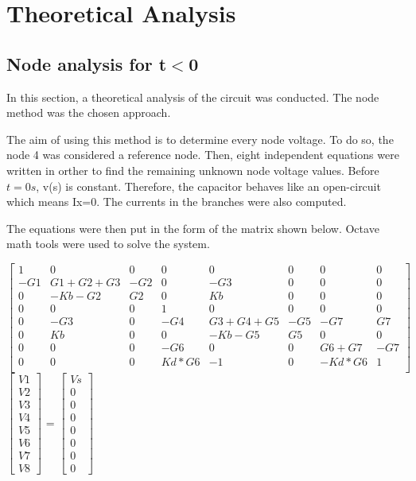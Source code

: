 \section{Theoretical Analysis} \label{section:theo}


\subsection{Node analysis for t$<$0}

\par In this section, a theoretical analysis of the circuit was conducted. The node method was the chosen approach.

The aim of using this method is to determine every node voltage. To do so, the node 4 was considered a reference node. Then, eight independent equations were written in orther to find the remaining unknown node voltage values. Before $t=0s$, v(s) is constant. Therefore, the capacitor behaves like an open-circuit which means Ix=0. The currents in the branches were also computed.


The equations were then put in the form of the matrix shown below. Octave math tools were used to solve the system.



$\begin{bmatrix}
1 & 0 & 0 & 0 & 0 & 0 & 0 & 0\\
-G1 & G1+G2+G3 & -G2 & 0 & -G3 & 0 & 0 & 0\\
0 &-Kb-G2 & G2 & 0 & Kb & 0 & 0 & 0\\
0 & 0 & 0 & 1 & 0 & 0 & 0 & 0\\
0 & -G3 & 0 & -G4 & G3+G4+G5 & -G5 & -G7 & G7\\
0 & Kb & 0 & 0 & -Kb-G5 & G5 & 0 & 0\\
0 & 0 & 0 & -G6 & 0 & 0 & G6+G7 & -G7\\
0 & 0 & 0 & Kd*G6 & -1 & 0 & -Kd*G6 & 1\\
\end{bmatrix}
$$\begin{bmatrix}
V1 \\ V2 \\ V3 \\ V4 \\ V5 \\ V6 \\ V7 \\ V8
\end{bmatrix}$
=
$\begin{bmatrix}
Vs \\ 0 \\ 0 \\ 0 \\ 0 \\ 0 \\ 0 \\ 0
\end{bmatrix}
$

